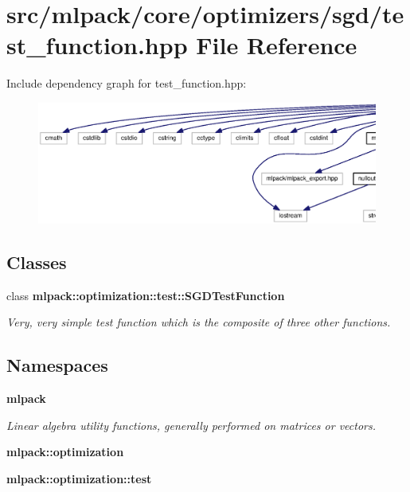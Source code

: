 \section{src/mlpack/core/optimizers/sgd/test\+\_\+function.hpp File Reference}
\label{sgd_2test__function_8hpp}
Include dependency graph for test\+\_\+function.\+hpp\+:
\nopagebreak
\begin{figure}[H]
\begin{center}
\leavevmode
\includegraphics[width=350pt]{sgd_2test__function_8hpp__incl}
\end{center}
\end{figure}
\subsection*{Classes}
\begin{DoxyCompactItemize}
\item 
class {\bf mlpack\+::optimization\+::test\+::\+S\+G\+D\+Test\+Function}
\begin{DoxyCompactList}\small\item\em Very, very simple test function which is the composite of three other functions. \end{DoxyCompactList}\end{DoxyCompactItemize}
\subsection*{Namespaces}
\begin{DoxyCompactItemize}
\item 
 {\bf mlpack}
\begin{DoxyCompactList}\small\item\em Linear algebra utility functions, generally performed on matrices or vectors. \end{DoxyCompactList}\item 
 {\bf mlpack\+::optimization}
\item 
 {\bf mlpack\+::optimization\+::test}
\end{DoxyCompactItemize}
